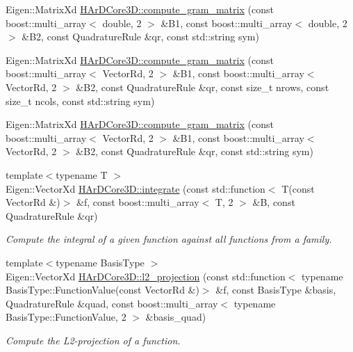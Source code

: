 \begin{DoxyCompactItemize}
\item 
Eigen\+::\+Matrix\+Xd \hyperlink{group__Basis_gaf151d3a8c29e1b18fd67b89eae756eca}{H\+Ar\+D\+Core3\+D\+::compute\+\_\+gram\+\_\+matrix} (const boost\+::multi\+\_\+array$<$ double, 2 $>$ \&B1, const boost\+::multi\+\_\+array$<$ double, 2 $>$ \&B2, const Quadrature\+Rule \&qr, const std\+::string sym)
\item 
Eigen\+::\+Matrix\+Xd \hyperlink{group__Basis_ga33b9c4c2ff96b783e8096d584a3e80a9}{H\+Ar\+D\+Core3\+D\+::compute\+\_\+gram\+\_\+matrix} (const boost\+::multi\+\_\+array$<$ Vector\+Rd, 2 $>$ \&B1, const boost\+::multi\+\_\+array$<$ Vector\+Rd, 2 $>$ \&B2, const Quadrature\+Rule \&qr, const size\+\_\+t nrows, const size\+\_\+t ncols, const std\+::string sym)
\item 
Eigen\+::\+Matrix\+Xd \hyperlink{group__Basis_ga70a3cd2df90246841fb82bfff01665ba}{H\+Ar\+D\+Core3\+D\+::compute\+\_\+gram\+\_\+matrix} (const boost\+::multi\+\_\+array$<$ Vector\+Rd, 2 $>$ \&B1, const boost\+::multi\+\_\+array$<$ Vector\+Rd, 2 $>$ \&B2, const Quadrature\+Rule \&qr, const std\+::string sym)
\item 
{\footnotesize template$<$typename T $>$ }\\Eigen\+::\+Vector\+Xd \hyperlink{group__Basis_ga714906e1afa0a6d8475d177b554a7cc0}{H\+Ar\+D\+Core3\+D\+::integrate} (const std\+::function$<$ T(const Vector\+Rd \&)$>$ \&f, const boost\+::multi\+\_\+array$<$ T, 2 $>$ \&B, const Quadrature\+Rule \&qr)
\begin{DoxyCompactList}\small\item\em Compute the integral of a given function against all functions from a family. \end{DoxyCompactList}\item 
{\footnotesize template$<$typename Basis\+Type $>$ }\\Eigen\+::\+Vector\+Xd \hyperlink{group__Basis_ga9fc99a6fc8eaea7b200fc643de492bea}{H\+Ar\+D\+Core3\+D\+::l2\+\_\+projection} (const std\+::function$<$ typename Basis\+Type\+::\+Function\+Value(const Vector\+Rd \&)$>$ \&f, const Basis\+Type \&basis, Quadrature\+Rule \&quad, const boost\+::multi\+\_\+array$<$ typename Basis\+Type\+::\+Function\+Value, 2 $>$ \&basis\+\_\+quad)
\begin{DoxyCompactList}\small\item\em Compute the L2-\/projection of a function. \end{DoxyCompactList}\end{DoxyCompactItemize}

